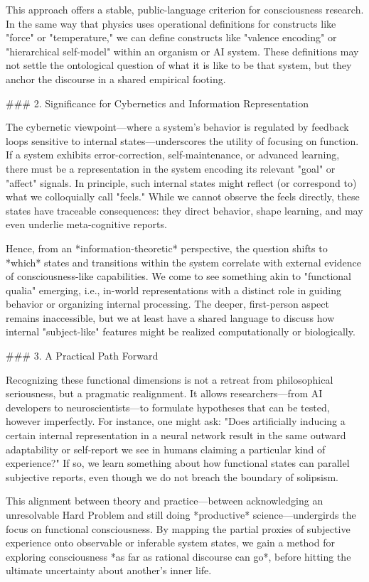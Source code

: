This approach offers a stable, public-language criterion for consciousness research. In the same way that physics uses operational definitions for constructs like "force" or "temperature," we can define constructs like "valence encoding" or "hierarchical self-model" within an organism or AI system. These definitions may not settle the ontological question of what it is like to be that system, but they anchor the discourse in a shared empirical footing.

### 2. Significance for Cybernetics and Information Representation

The cybernetic viewpoint—where a system's behavior is regulated by feedback loops sensitive to internal states—underscores the utility of focusing on function. If a system exhibits error-correction, self-maintenance, or advanced learning, there must be a representation in the system encoding its relevant "goal" or "affect" signals. In principle, such internal states might reflect (or correspond to) what we colloquially call "feels." While we cannot observe the feels directly, these states have traceable consequences: they direct behavior, shape learning, and may even underlie meta-cognitive reports.

Hence, from an *information-theoretic* perspective, the question shifts to *which* states and transitions within the system correlate with external evidence of consciousness-like capabilities. We come to see something akin to "functional qualia" emerging, i.e., in-world representations with a distinct role in guiding behavior or organizing internal processing. The deeper, first-person aspect remains inaccessible, but we at least have a shared language to discuss how internal "subject-like" features might be realized computationally or biologically.

### 3. A Practical Path Forward

Recognizing these functional dimensions is not a retreat from philosophical seriousness, but a pragmatic realignment. It allows researchers—from AI developers to neuroscientists—to formulate hypotheses that can be tested, however imperfectly. For instance, one might ask: "Does artificially inducing a certain internal representation in a neural network result in the same outward adaptability or self-report we see in humans claiming a particular kind of experience?" If so, we learn something about how functional states can parallel subjective reports, even though we do not breach the boundary of solipsism.

This alignment between theory and practice—between acknowledging an unresolvable Hard Problem and still doing *productive* science—undergirds the focus on functional consciousness. By mapping the partial proxies of subjective experience onto observable or inferable system states, we gain a method for exploring consciousness *as far as rational discourse can go*, before hitting the ultimate uncertainty about another's inner life.



